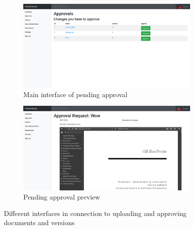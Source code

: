 \begin{figure}[H]\ContinuedFloat
	\centering
	\begin{subfigure}[b]{0.48\textwidth}
		\includegraphics[width=\textwidth]{billeder/iteration2Prototyper/Approve.png}
		\caption{Main interface of pending approval}
		\label{fig:4-Approve}
	\end{subfigure}
	\quad
	\begin{subfigure}[b]{0.48\textwidth}
		\includegraphics[width=\textwidth]{billeder/iteration2Prototyper/AppReq.png}
		\caption{Pending approval preview}
		\label{fig:4-AppReq}
	\end{subfigure}
	\caption{Different interfaces in connection to uploading and approving documents and versions}\label{fig:4-MockUp}
\end{figure}

